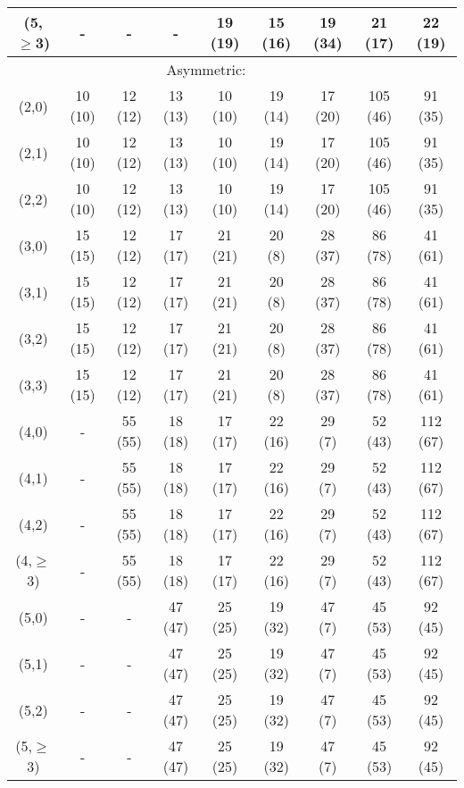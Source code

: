\begin{table}[h!]
\begin{tabular}{ ccccccccc }
    (5,$\geq$3) & -       & -       & -       & 19 (19) & 15 (16) & 19 (34) & 21 (17)  & 22 (19)   \\
    \hline
    \multicolumn{8}{c}{Asymmetric:}                                                                \\
    (2,0)       & 10 (10) & 12 (12) & 13 (13) & 10 (10) & 19 (14) & 17 (20) & 105 (46) & 91   (35) \\
    (2,1)       & 10 (10) & 12 (12) & 13 (13) & 10 (10) & 19 (14) & 17 (20) & 105 (46) & 91   (35) \\
    (2,2)       & 10 (10) & 12 (12) & 13 (13) & 10 (10) & 19 (14) & 17 (20) & 105 (46) & 91   (35) \\
    (3,0)       & 15 (15) & 12 (12) & 17 (17) & 21 (21) & 20 (8)  & 28 (37) & 86 (78)  & 41   (61) \\
    (3,1)       & 15 (15) & 12 (12) & 17 (17) & 21 (21) & 20 (8)  & 28 (37) & 86 (78)  & 41   (61) \\
    (3,2)       & 15 (15) & 12 (12) & 17 (17) & 21 (21) & 20 (8)  & 28 (37) & 86 (78)  & 41   (61) \\
    (3,3)       & 15 (15) & 12 (12) & 17 (17) & 21 (21) & 20 (8)  & 28 (37) & 86 (78)  & 41   (61) \\
    (4,0)       & -       & 55 (55) & 18 (18) & 17 (17) & 22 (16) & 29 (7)  & 52 (43)  & 112  (67) \\
    (4,1)       & -       & 55 (55) & 18 (18) & 17 (17) & 22 (16) & 29 (7)  & 52 (43)  & 112  (67) \\
    (4,2)       & -       & 55 (55) & 18 (18) & 17 (17) & 22 (16) & 29 (7)  & 52 (43)  & 112  (67) \\
    (4,$\geq$3) & -       & 55 (55) & 18 (18) & 17 (17) & 22 (16) & 29 (7)  & 52 (43)  & 112  (67) \\
    (5,0)       & -       & -       & 47 (47) & 25 (25) & 19 (32) & 47 (7)  & 45 (53)  & 92   (45) \\
    (5,1)       & -       & -       & 47 (47) & 25 (25) & 19 (32) & 47 (7)  & 45 (53)  & 92   (45) \\
    (5,2)       & -       & -       & 47 (47) & 25 (25) & 19 (32) & 47 (7)  & 45 (53)  & 92   (45) \\
    (5,$\geq$3) & -       & -       & 47 (47) & 25 (25) & 19 (32) & 47 (7)  & 45 (53)  & 92   (45) \\
    \hline
    \hline
  \end{tabular}
\end{table}

\newpage 

